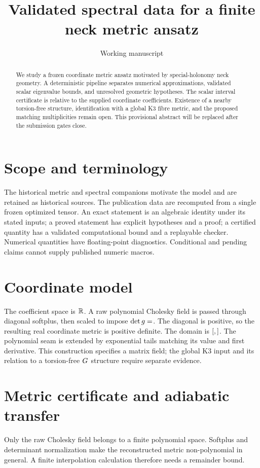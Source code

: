 \documentclass{article}
\title{Validated spectral data for a finite neck metric ansatz}
\author{Working manuscript}
\date{}
\newcommand{\Claim}[1]{\csname claim-#1\endcsname}
\begin{document}
\maketitle
\begin{abstract}
We study a frozen coordinate metric ansatz motivated by special-holonomy
neck geometry. A deterministic pipeline separates numerical approximations,
validated scalar eigenvalue bounds, and unresolved geometric hypotheses.
The scalar interval certificate is relative to the supplied coordinate
coefficients. Existence of a nearby torsion-free structure, identification
with a global K3 fibre metric, and the proposed matching multiplicities
remain open. This provisional abstract will be replaced after the
submission gates close.
\end{abstract}

\section{Scope and terminology}
The historical metric and spectral companions \cite{legacyA,legacyB}
motivate the model and are retained as historical sources.
The publication data are recomputed from a single frozen optimized tensor.
An exact statement is an algebraic identity under its stated inputs;
a proved statement has explicit hypotheses and a proof; a certified
quantity has a validated computational bound and a replayable checker.
Numerical quantities have floating-point diagnostics. Conditional and
pending claims cannot supply published numeric macros.

\section{Coordinate model}
The coefficient space is
$\mathbb R^{\Claim{parameter_count}}$.
A raw polynomial Cholesky field is passed through diagonal softplus,
then scaled to impose $\det g=\Claim{determinant}$.
The diagonal is positive, so the resulting real coordinate metric is
positive definite. The domain is
$[\Claim{left_endpoint},\Claim{right_endpoint}]$.
The polynomial seam is extended by exponential tails matching its
value and first derivative.
This construction specifies a matrix field; the global K3 input and
its relation to a torsion-free $G_{\Claim{two}}$ structure require
separate evidence.

\section{Metric certificate and adiabatic transfer}
Only the raw Cholesky field belongs to a finite polynomial space.
Softplus and determinant normalization make the reconstructed metric
non-polynomial in general. A finite interpolation calculation therefore
needs a remainder bound.
\end{document}
